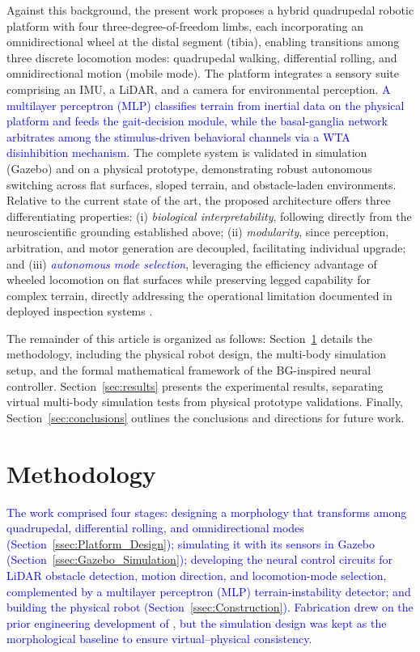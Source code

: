 \documentclass[preprint,12pt]{elsarticle}
\newcommand{\revblue}[1]{\textcolor{blue}{#1}}
\begin{document}
Against this background, the present work proposes a hybrid quadrupedal robotic platform with four three-degree-of-freedom limbs, each incorporating an omnidirectional wheel at the distal segment (tibia), enabling transitions among three discrete locomotion modes: quadrupedal walking, differential rolling, and omnidirectional motion (mobile mode). The platform integrates a sensory suite comprising an IMU, a LiDAR, and a camera for environmental perception. \revblue{A multilayer perceptron (MLP) classifies terrain from inertial data on the physical platform and feeds the gait-decision module, while the basal-ganglia network arbitrates among the stimulus-driven behavioral channels via a WTA disinhibition mechanism.} The complete system is validated in simulation (Gazebo) and on a physical prototype, demonstrating robust autonomous switching across flat surfaces, sloped terrain, and obstacle-laden environments. Relative to the current state of the art, the proposed architecture offers three differentiating properties: (i) \emph{biological interpretability}, following directly from the neuroscientific grounding established above; (ii) \emph{modularity}, since perception, arbitration, and motor generation are decoupled, facilitating individual upgrade; and (iii) \revblue{\emph{autonomous mode selection}}, leveraging the efficiency advantage of wheeled locomotion on flat surfaces while preserving legged capability for complex terrain, directly addressing the operational limitation documented in deployed inspection systems \citep{Hutter2017ANYmal,Tranzatto2022CERBERUS}.

The remainder of this article is organized as follows: Section~\ref{sec:methodology} details the methodology, including the physical robot design, the multi-body simulation setup, and the formal mathematical framework of the BG-inspired neural controller. Section~\ref{sec:results} presents the experimental results, separating virtual multi-body simulation tests from physical prototype validations. Finally, Section~\ref{sec:conclusions} outlines the conclusions and directions for future work.

\section{Methodology}
\label{sec:methodology}

\revblue{The work comprised four stages: designing a morphology that transforms among quadrupedal, differential rolling, and omnidirectional modes (Section~\ref{ssec:Platform_Design}); simulating it with its sensors in Gazebo (Section~\ref{ssec:Gazebo_Simulation}); developing the neural control circuits for LiDAR obstacle detection, motion direction, and locomotion-mode selection, complemented by a multilayer perceptron (MLP) terrain-instability detector; and building the physical robot (Section~\ref{ssec:Construction}). Fabrication drew on the prior engineering development of \citet{Grajales_Des_2025}, but the simulation design was kept as the morphological baseline to ensure virtual--physical consistency.} 
\end{document}
